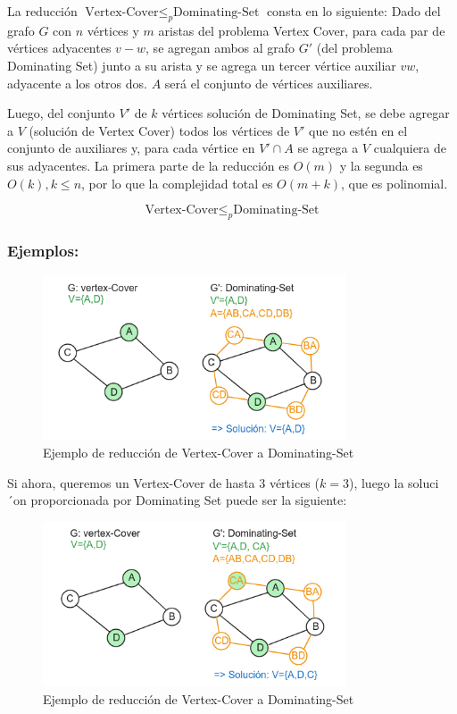 La reducción $\text{Vertex-Cover} \leq _{p} \text{Dominating-Set}$ consta en lo siguiente:
Dado del grafo $G$ con $n$ vértices y $m$ aristas del problema Vertex Cover, para cada par de 
vértices adyacentes $v-w$, se agregan ambos al grafo $G'$ (del problema Dominating Set) junto a 
su arista y se agrega un tercer vértice auxiliar $vw$, adyacente a los otros dos. $A$ será el 
conjunto de vértices auxiliares. 

Luego, del conjunto $V'$ de $k$ vértices solución de Dominating Set, se debe agregar a $V$ (solución de Vertex Cover) todos los vértices de $V'$ que no estén en el conjunto de auxiliares y, para cada vértice en $V' \cap A$ se agrega a $V$  cualquiera de sus adyacentes. La primera parte de la reducción es $O(m)$ y la segunda es $O(k),k \leq n$, por lo que la complejidad total es $O(m+k)$, que es polinomial.

\[\text{Vertex-Cover} \leq _{p} \text{Dominating-Set}\]

\subsubsection{Ejemplos:} 
\begin{figure}[H]
    \centering
    \includegraphics[width=0.8\textwidth]{img/ejemplo1_VC-DS.png}
    \caption{Ejemplo de reducción de Vertex-Cover a Dominating-Set}
    \label{fig:ejemplo1_VC-DS}
\end{figure}

Si ahora, queremos un Vertex-Cover de hasta 3 vértices ($k=3$), luego la soluci´on proporcionada por Dominating Set puede ser la siguiente:

\begin{figure}[H]
    \centering
    \includegraphics[width=0.8\textwidth]{img/ejemplo2_VC-DS.png}
    \caption{Ejemplo de reducción de Vertex-Cover a Dominating-Set}
    \label{fig:ejemplo2_VC-DS}
\end{figure}



